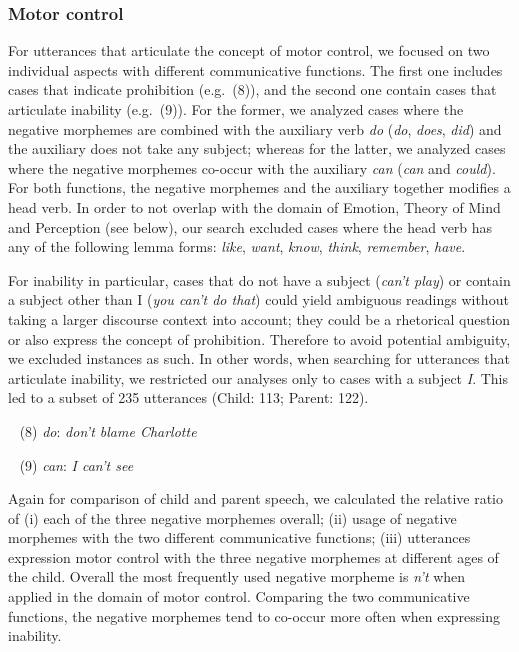 \documentclass[10pt, letterpaper]{article}
\begin{document}
\hypertarget{motor-control}{%
\subsubsection{Motor control}\label{motor-control}}

For utterances that articulate the concept of motor control, we focused
on two individual aspects with different communicative functions. The
first one includes cases that indicate prohibition (e.g.~(8)), and the
second one contain cases that articulate inability (e.g.~(9)). For the
former, we analyzed cases where the negative morphemes are combined with
the auxiliary verb \emph{do} (\emph{do}, \emph{does}, \emph{did}) and
the auxiliary does not take any subject; whereas for the latter, we
analyzed cases where the negative morphemes co-occur with the auxiliary
\emph{can} (\emph{can} and \emph{could}). For both functions, the
negative morphemes and the auxiliary together modifies a head verb. In
order to not overlap with the domain of Emotion, Theory of Mind and
Perception (see below), our search excluded cases where the head verb
has any of the following lemma forms: \emph{like}, \emph{want},
\emph{know}, \emph{think}, \emph{remember}, \emph{have}.

For inability in particular, cases that do not have a subject
(\emph{can't play}) or contain a subject other than I (\emph{you can't
do that}) could yield ambiguous readings without taking a larger
discourse context into account; they could be a rhetorical question or
also express the concept of prohibition. Therefore to avoid potential
ambiguity, we excluded instances as such. In other words, when searching
for utterances that articulate inability, we restricted our analyses
only to cases with a subject \emph{I}. This led to a subset of 235
utterances (Child: 113; Parent: 122).

~ (8) \emph{do}: \emph{don't blame Charlotte}

~ (9) \emph{can}: \emph{I can't see}

Again for comparison of child and parent speech, we calculated the
relative ratio of (i) each of the three negative morphemes overall; (ii)
usage of negative morphemes with the two different communicative
functions; (iii) utterances expression motor control with the three
negative morphemes at different ages of the child. Overall the most
frequently used negative morpheme is \emph{n't} when applied in the
domain of motor control. Comparing the two communicative functions, the
negative morphemes tend to co-occur more often when expressing
inability.
\end{document}

